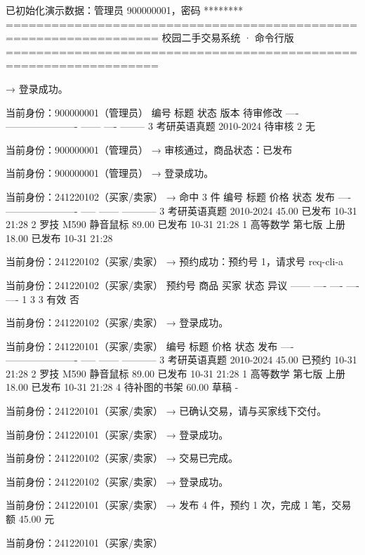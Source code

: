 已初始化演示数据：管理员 900000001，密码 ********
==================================================================
                    校园二手交易系统 · 命令行版
==================================================================

  → 登录成功。

  当前身份：900000001（管理员）
  编号  标题                    状态    版本  待审修改
  ----  ----------------------  ------  ----  --------
     3  考研英语真题 2010-2024  待审核     2  无

  当前身份：900000001（管理员）
  → 审核通过，商品状态：已发布

  当前身份：900000001（管理员）
  → 登录成功。

  当前身份：241220102（买家/卖家）
  → 命中 3 件
  编号  标题                     价格  状态    发布
  ----  ----------------------  -----  ------  -----------
     3  考研英语真题 2010-2024  45.00  已发布  10-31 21:28
     2  罗技 M590 静音鼠标      89.00  已发布  10-31 21:28
     1  高等数学 第七版 上册    18.00  已发布  10-31 21:28

  当前身份：241220102（买家/卖家）
  → 预约成功：预约号 1，请求号 req-cli-a

  当前身份：241220102（买家/卖家）
  预约号  商品  买家  状态  异议
  ------  ----  ----  ----  ----
       1     3     3  有效  否

  当前身份：241220102（买家/卖家）
  → 登录成功。

  当前身份：241220101（买家/卖家）
  编号  标题                     价格  状态    发布
  ----  ----------------------  -----  ------  -----------
     3  考研英语真题 2010-2024  45.00  已预约  10-31 21:28
     2  罗技 M590 静音鼠标      89.00  已发布  10-31 21:28
     1  高等数学 第七版 上册    18.00  已发布  10-31 21:28
     4  待补图的书架            60.00  草稿    -

  当前身份：241220101（买家/卖家）
  → 已确认交易，请与买家线下交付。

  当前身份：241220101（买家/卖家）
  → 登录成功。

  当前身份：241220102（买家/卖家）
  → 交易已完成。

  当前身份：241220102（买家/卖家）
  → 登录成功。

  当前身份：241220101（买家/卖家）
  → 发布 4 件，预约 1 次，完成 1 笔，交易额 45.00 元

  当前身份：241220101（买家/卖家）
